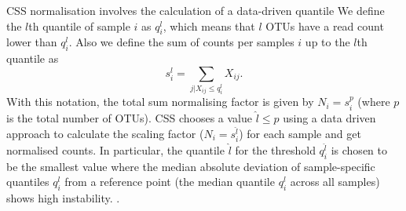 CSS normalisation involves the calculation of a data-driven quantile 
We define the $l$th quantile of sample $i$ as $q_i^l$, which means that $l$ OTUs have a read count lower than $q_i^l$. Also we define the sum of counts per samples $i$ up to the $l$th quantile as
\begin{equation}
	s_{i}^{l}=\sum_{j|X_{ij} \leq q_{i}^{l}} X_{ij}.
\end{equation} 
With this notation, the total sum normalising factor is given by $N_i = s_i^p$ (where $p$ is the total number of OTUs). CSS chooses a value $\hat{l} \leq p$ using a data driven approach to calculate the scaling factor ($N_i = s_i^{\hat{l}}$) for each sample and get normalised counts.
In particular, the quantile $\hat{l}$ for the threshold $q_i^{\hat{l}}$ is chosen  to be the smallest value where the median absolute deviation of sample-specific quantiles $q_i^l$ from a reference point (the median quantile $q_i^l$ across all samples) shows high instability. \cite{css_diff_abund}.

